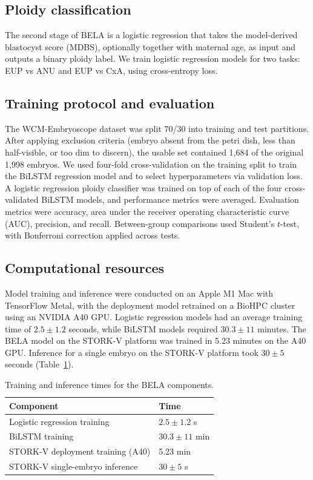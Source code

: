 \documentclass[10pt]{article}
\begin{document}
\subsection{Ploidy classification}
The second stage of BELA is a logistic regression that takes the model-derived
blastocyst score (MDBS), optionally together with maternal age, as input and
outputs a binary ploidy label. We train logistic regression models for two
tasks: EUP vs ANU and EUP vs CxA, using cross-entropy loss.

\subsection{Training protocol and evaluation}
The WCM-Embryoscope dataset was split 70/30 into training and test partitions.
After applying exclusion criteria (embryo absent from the petri dish,
less than half-visible, or too dim to discern), the usable set contained 1{,}684
of the original 1{,}998 embryos. We used four-fold cross-validation on the
training split to train the BiLSTM regression model and to select
hyperparameters via validation loss. A logistic regression ploidy classifier
was trained on top of each of the four cross-validated BiLSTM models, and
performance metrics were averaged. Evaluation metrics were accuracy,
area under the receiver operating characteristic curve (AUC), precision, and
recall. Between-group comparisons used Student's $t$-test, with Bonferroni
correction applied across tests.

\subsection{Computational resources}
Model training and inference were conducted on an Apple M1 Mac with
TensorFlow Metal, with the deployment model retrained on a BioHPC cluster
using an NVIDIA A40 GPU. Logistic regression models had an average training
time of $2.5 \pm 1.2$ seconds, while BiLSTM models required $30.3 \pm 11$
minutes. The BELA model on the STORK-V platform was trained in 5.23 minutes
on the A40 GPU. Inference for a single embryo on the STORK-V platform took
$30 \pm 5$ seconds (Table~\ref{tab:timing}).

\begin{table}[htbp]
\centering
\caption{Training and inference times for the BELA components.}
\label{tab:timing}
\begin{tabular}{ll}
\toprule
Component & Time \\
\midrule
Logistic regression training        & $2.5 \pm 1.2$ s \\
BiLSTM training                     & $30.3 \pm 11$ min \\
STORK-V deployment training (A40)   & 5.23 min \\
STORK-V single-embryo inference     & $30 \pm 5$ s \\
\bottomrule
\end{tabular}
\end{table}
\end{document}
